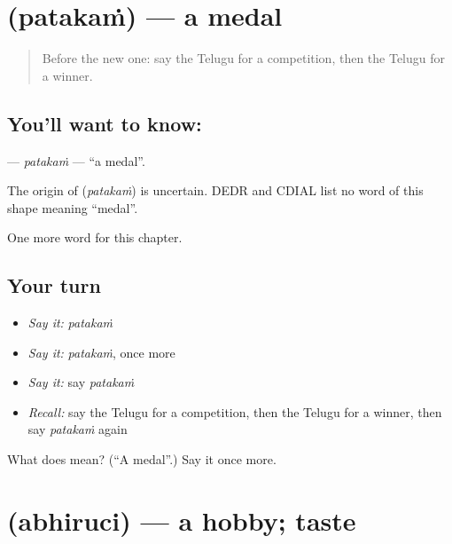 \section[\texorpdfstring{\te{పతకం} (patakaṁ)}{పతకం (patakaṁ)}]{ (patakaṁ) — a medal}

\label{lesson:TE-C189-patakam}



\begin{quote}
Before the new one: say the Telugu for a competition, then the Telugu for a winner.
\end{quote}

\subsection*{You'll want to know: }
\textbf{} — \emph{patakaṁ} — \textquotedblleft{}a medal\textquotedblright{}.

\begin{cousinweb}
The origin of \textbf{} (\emph{patakaṁ}) is uncertain. DEDR and CDIAL list no word of this shape meaning \textquotedblleft{}medal\textquotedblright{}.
\end{cousinweb}

\begin{grammarlens}[title={What you've built}]
One more word for this chapter.
\end{grammarlens}

\subsection*{Your turn}
\begin{itemize}
\raggedright
  \item \emph{Say it:} \emph{patakaṁ}
  \item \emph{Say it:} \emph{patakaṁ}, once more
  \item \emph{Say it:} say \emph{patakaṁ}
  \item \emph{Recall:} say the Telugu for a competition, then the Telugu for a winner, then say \emph{patakaṁ} again
\end{itemize}

\begin{tcolorbox}[breakable,colback=teal!4,colframe=teal!35!black,title={Before you move on}]
What does  mean? (\textquotedblleft{}A medal\textquotedblright{}.) Say it once more.
\end{tcolorbox}
\section[\texorpdfstring{\te{అభిరుచి} (abhiruci)}{అభిరుచి (abhiruci)}]{ (abhiruci) — a hobby; taste}


